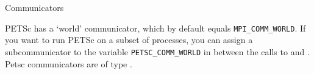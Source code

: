 
 {Communicators}

PETSc has a `world' communicator, which by default equals
\lstinline{MPI_COMM_WORLD}. If you want to run PETSc on a subset of processes,
you can assign a subcommunicator to the variable \lstinline{PETSC_COMM_WORLD}
in between the calls to  and
.
Petsc communicators are of type .

\endinput

\Level 0 {Scalars}
\label{sec:petsc-scalar}

The definition of
\indexpetscdef{PetscInt}, \indexpetscdef{PetscReal}, \indexpetscdef{PetscComplex}
depends on how PETSc was installed.
This makes interoperability with other libraries such as
\emph{MPI}%
a little tricky.

The equivalent \indexpetscshow{MPI_Datatype} values are
\indexpetscdef{PetscMPIInt}
\indexpetscdef{MPIU_INT}
\indexpetscdef{MPIU_REAL}
\indexpetscdef{MPIU_SCALAR}
\indexpetscdef{MPIU_COMPLEX}

Similarly, for the
\emph{BLAS}%
library there  are:
%
\indexpetscdef{PetscBLASInt}

No real types are needed since these are passed by reference.


